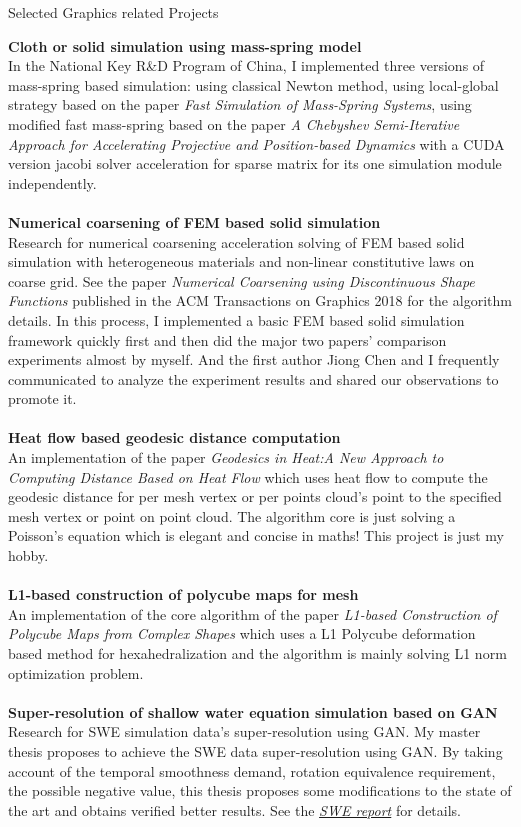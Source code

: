 \documentclass{resume} %
\begin{document}
\begin{rSection}{Selected Graphics related Projects}

  {\bf Cloth or solid simulation using mass-spring model}\\In the National Key R\&D Program of China, I implemented three versions of mass-spring based simulation: using classical Newton method, using local-global strategy based on the paper \textit{Fast Simulation of Mass-Spring Systems}, using modified fast mass-spring based on the paper \textit{A Chebyshev Semi-Iterative Approach for Accelerating Projective and Position-based Dynamics} with a CUDA version jacobi solver acceleration for sparse matrix for its one simulation module independently.\\
  \\{\bf Numerical coarsening of FEM based solid simulation}\\ Research for numerical coarsening acceleration solving of FEM based solid simulation with heterogeneous materials and non-linear constitutive laws on coarse grid. See the paper \emph{Numerical Coarsening using Discontinuous Shape Functions} published in the ACM Transactions on Graphics 2018 for the algorithm details. In this process, I implemented a basic FEM based solid simulation framework quickly first and then did the major two papers' comparison experiments almost by myself. And the first author Jiong Chen and I frequently communicated to analyze the experiment results and shared our observations to promote it. \\
  \\{\bf Heat flow based geodesic distance computation}\\An implementation of the paper \emph{Geodesics in Heat:A New Approach to Computing Distance Based on Heat Flow} which uses heat flow to compute the geodesic distance for per mesh vertex or per points cloud's point to the specified mesh vertex or point on point cloud. The algorithm core is just solving a Poisson's equation which is elegant and concise in maths! This project is just my hobby.\\
  \\{\bf L1-based construction of polycube maps for mesh}\\ An implementation of the core algorithm of the paper \emph{L1-based Construction of Polycube Maps from Complex Shapes} which uses a L1 Polycube deformation based method for hexahedralization and the algorithm is mainly solving L1 norm optimization problem.\\
  \\{\bf Super-resolution of shallow water equation simulation based on GAN}\\ Research for SWE simulation data's super-resolution using GAN. My master thesis proposes to achieve the SWE data super-resolution using GAN. By taking account of the temporal smoothness demand, rotation equivalence requirement, the possible negative value, this thesis proposes some modifications to the state of the art and obtains verified better results. See the \emph{\href{https://wtyatzoo.github.io/reports/SWE.pdf}{SWE report}} for details. \\

\end{rSection}
\end{document}
